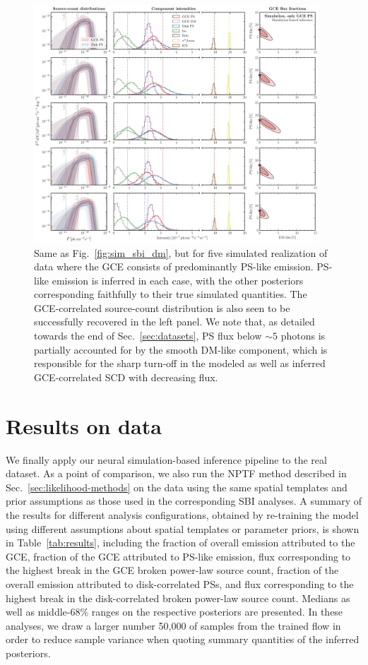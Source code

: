 \documentclass[prd,aps,10pt,nofootinbib,twocolumn,superscriptaddress,preprintnumbers,balancelastpage,longbibliography,floatfix]{revtex4-2}
\begin{document}
%
\begin{figure}[!htbp]
\centering
\includegraphics[width=0.95\textwidth]{plots/sim_sbi_ps.pdf}
\caption{Same as Fig.~\ref{fig:sim_sbi_dm}, but for five simulated realization of \Fermi data where the GCE consists of predominantly PS-like emission. PS-like emission is inferred in each case, with the other posteriors corresponding faithfully to their true simulated quantities. The GCE-correlated source-count distribution is also seen to be successfully recovered in the left panel. We note that, as detailed towards the end of Sec.~\ref{sec:datasets}, PS flux below $\sim 5$ photons is partially accounted for by the smooth DM-like component, which is responsible for the sharp turn-off in the modeled as well as inferred GCE-correlated SCD with decreasing flux.}
\label{fig:sim_sbi_ps}
\end{figure}
%

\section{Results on \Fermi data}
\label{sec:data}

We finally apply our neural simulation-based inference pipeline to the real \Fermi dataset. As a point of comparison, we also run the NPTF method described in Sec.~\ref{sec:likelihood-methods} on the data using the same spatial templates and prior assumptions as those used in the corresponding SBI analyses. A summary of the results for different analysis configurations, obtained by re-training the model using different assumptions about spatial templates or parameter priors, is shown in Table~\ref{tab:results}, including the fraction of overall emission attributed to the GCE, fraction of the GCE attributed to PS-like emission, flux corresponding to the highest break in the GCE broken power-law source count, fraction of the overall emission attributed to disk-correlated PSs, and flux corresponding to the highest break in the disk-correlated broken power-law source count. Medians as well as middle-68\% ranges on the respective posteriors are presented. In these analyses, we draw a larger number 50,000 of samples from the trained flow in order to reduce sample variance when quoting summary quantities of the inferred posteriors.
\end{document}
